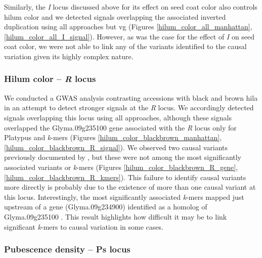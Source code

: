 Similarly, the \textit{I} locus discussed above for its effect on seed coat
color also controls hilum color and we detected signals overlapping the
associated inverted duplication using all approaches but vg (Figures
\ref{hilum_color_all_manhattan}, \ref{hilum_color_all_I_signal}). However,
as was the case for the effect of \textit{I} on seed coat color, we were
not able to link any of the variants identified to the causal variation given
its highly complex nature.

\subsubsection*{Hilum color -- \textit{R} locus}
\label{sv-gwas-main-results-hilum-color-r}

We conducted a GWAS analysis contrasting accessions with black and brown hila
in an attempt to detect stronger signals at the \textit{R} locus.  We
accordingly detected signals overlapping this locus using all approaches,
although these signals overlapped the Glyma.09g235100 gene associated with the
\textit{R} locus only for Platypus and \textit{k}-mers (Figures
\ref{hilum_color_blackbrown_manhattan}, \ref{hilum_color_blackbrown_R_signal}).
We observed two causal variants previously documented by \cite{gillman2011},
but these were not among the most significantly associated variants or
\textit{k}-mers (Figures \ref{hilum_color_blackbrown_R_gene},
\ref{hilum_color_blackbrown_R_kmers}).  This failure to identify causal
variants more directly is probably due to the existence of more than one causal
variant at this locus. Interestingly, the most significantly associated
\textit{k}-mers mapped just upstream of a gene (Glyma.09g234900) identified as
a homolog of Glyma.09g235100 \citep{gillman2011}. This result highlights how
difficult it may be to link significant \textit{k}-mers to causal variation in
some cases.

\subsubsection*{Pubescence density -- Ps locus}
\label{sv-gwas-main-results-pubescence-density-ps}

